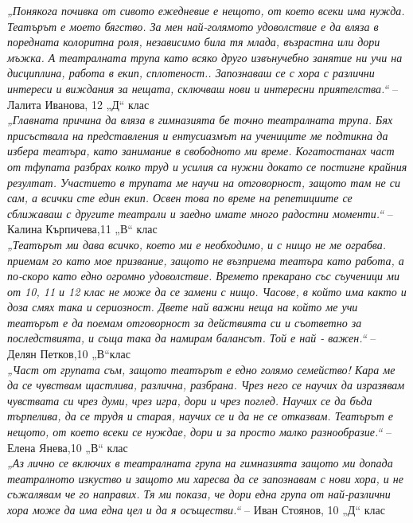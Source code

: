 \begin{multicols}{2}
\textit{„Понякога почивка от сивото ежедневие е нещото, от което всеки има нужда. Театърът е моето бягство. За мен най-голямото удоволствие е да вляза в поредната колоритна роля, независимо била тя млада, възрастна или дори мъжка. А театралната трупа като всяко друго извънучебно занятие ни учи на дисциплина, работа в екип, сплотеност.. Запознаваш се с хора с различни интереси и виждания за нещата, сключваш нови и интересни приятелства.“} – Лалита Иванова, 12 „Д“ клас \\

\textit{„Главната причина да вляза в гимназията бе точно театралната трупа. Бях присъствала на представления и ентусиазмът на учениците ме подтикна да избера театъра, като занимание в свободното ми време. Когатостанах част от тфупата разбрах колко труд и усилия са нужни докато се постигне крайния резултат. Участието в трупата ме научи на отговорност, защото там не си сам, а всички сте един екип. Освен това по време на репетициите се сближаваш с другите театрали и заедно имате много радостни моменти.“} – Калина Кърпичева,11 „В“ клас \\

\textit{„Театърът ми  дава всичко, което ми е необходимо, и с нищо не ме ограбва. приемам го като мое призвание, защото  не възприема театъра като работа, а по-скоро като едно огромно удоволствие. Времето прекарано със съученици ми от 10, 11 и 12 клас не може да се замени с нищо. Часове, в който има както и доза смях така и сериозност. Двете най важни неща на който ме учи театърът е да поемам отговорност за действията си и съответно за последствията, и съща така да намирам балансът. Той е най - важен.“} – Делян Петков,10 „В“клас \\

\textit{„Част от групата съм, защото театърът е едно голямо семейство! Кара ме да се чувствам щастлива, различна, разбрана. Чрез него се научих да изразявам чувствата си чрез думи, чрез игра, дори и чрез поглед. Научих се да бъда търпелива, да се трудя и старая, научих се и да не се отказвам. Театърът е нещото, от което всеки се нуждае, дори и за просто малко разнообразие.“} – Елена Янева,10 „В“ клас \\

\textit{„Аз лично се включих в театралната група на гимназията защото ми допада театралното изкуство и защото ми харесва да се запознавам с нови хора, и не съжалявам че го направих. Тя ми показа, че дори една  група от най-различни хора може да има една цел и да я осъществи.“ } – Иван Стоянов, 10 „Д“ клас

\closearticle
\end{multicols}


